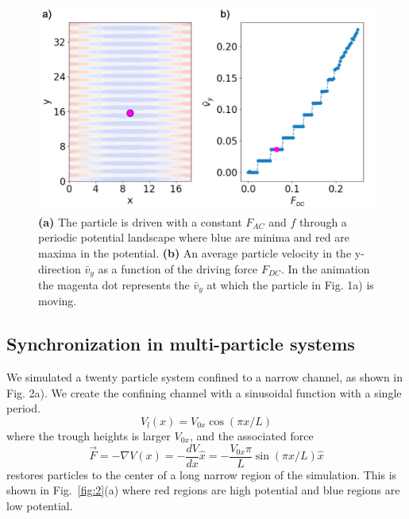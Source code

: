 \documentclass[prb,preprint]{revtex4}
\begin{document}
\begin{center}
\begin{figure}[h!]
\centering
\includegraphics[scale=.25]{single}
\caption{\textbf{(a)} The particle is driven with a constant $F_{AC}$ and $f$ through a periodic potential landscape where blue are minima and red are maxima in the potential. \textbf{(b)} An average particle velocity in the y-direction $\bar{v}_{y}$ as a function of the driving force $F_{DC}$. In the animation the magenta dot represents the $\bar{v}_{y}$ at which the particle in Fig. 1a) is moving.}
\label{fig:1}
\end{figure}
\end{center}

\subsection{Synchronization in multi-particle systems}
\label{sec:sync}

We simulated a twenty particle system confined to a narrow channel, as shown in Fig. 2a).  We create the confining channel with a sinusoidal function
with a single period.
\begin{equation}
  \label{eq:channel}
  V_l(x) = V_{0x} \cos{(\pi x/L)}
\end{equation}
where the trough heights is larger  $V_{0x}$,
and the associated force
\begin{equation}
\vec{F}=-\nabla V(x) = -\frac{dV}{dx} \hat{x} = - \frac{V_{0x} \pi}{L} \sin{(\pi x/L)} \hat{x}
\end{equation}
restores particles to the center of a long narrow region of the simulation.
This is shown in Fig.~\ref{fig:2}(a)
where red regions are high potential
and blue regions are low potential.
\end{document}
